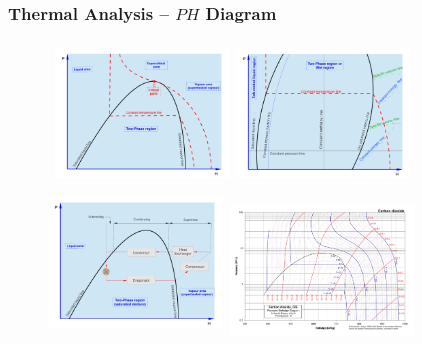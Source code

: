 \documentclass[10pt,compress]{beamer}
\begin{document}
\begin{frame}
 \frametitle{Thermal Analysis -- $PH$ Diagram}
   \begin{figure}%
     \vbox{
      \hbox{\hspace{.8cm}
      \includegraphics[width=4.6cm,height=3.8cm,clip]{./Pics/Overview_Refrig18}
      \hspace{.1cm}
      \includegraphics[width=4.6cm,height=3.8cm,clip]{./Pics/Overview_Refrig17}}
      \vspace{-.1cm}
      \hbox{\hspace{.8cm}
      \includegraphics[width=4.6cm,height=3.87cm,clip]{./Pics/Overview_Refrig19}
      \hspace{.1cm}
      \includegraphics[width=4.9cm,height=4.cm,clip]{./Pics/CO2col}}}
   \end{figure}
\end{frame}
\end{document}
